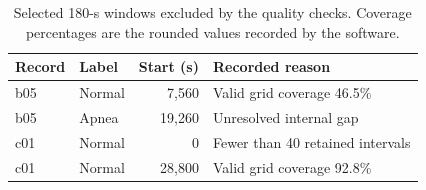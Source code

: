 \begin{table}[htbp]
\centering
\small
\begin{tabular}{llrl}
\toprule
Record & Label & Start (s) & Recorded reason \\
\midrule
b05 & Normal & 7,560 & Valid grid coverage 46.5\% \\
b05 & Apnea & 19,260 & Unresolved internal gap \\
c01 & Normal & 0 & Fewer than 40 retained intervals \\
c01 & Normal & 28,800 & Valid grid coverage 92.8\% \\
\bottomrule
\end{tabular}
\caption{Selected 180-s windows excluded by the quality checks. Coverage percentages are the rounded values recorded by the software.}
\label{tab:rejected}
\end{table}
